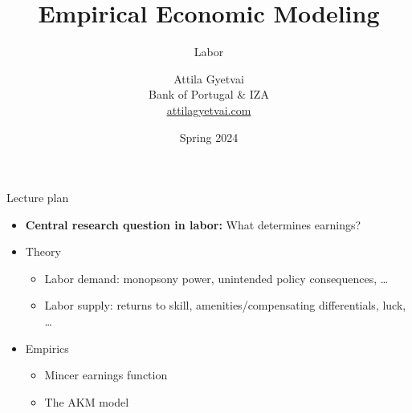 \documentclass[aspectratio=169,compress,t,xcolor=table]{beamer}
\title[]{Empirical Economic Modeling}
\subtitle{Labor}
\author[]{%
  \texorpdfstring{%
    Attila Gyetvai \\ \vspace*{0.5em} \footnotesize Bank of Portugal \& IZA \\ \href{https://attilagyetvai.com}{\color{MyStructure}\ul{attilagyetvai.com}}
  }{Gyetvai}
}
\date[]{\footnotesize Spring 2024}
\begin{document}
{
\begin{frame}
  \titlepage
\end{frame}
}
\addtocounter{framenumber}{-1}

\begin{frame}{Lecture plan}
  \begin{itemize}
    \vfill\item {\color{MyStructure}\textbf{Central research question in labor:}} What determines earnings?
    \vfill\item Theory
    \begin{itemize}
      \addtolength{\baselineskip}{1em}
      \item Labor demand: monopsony power, unintended policy consequences, \ldots
      \item Labor supply: returns to skill, amenities/compensating differentials, luck, \ldots
    \end{itemize}
    \vfill\item Empirics
    \begin{itemize}
      \addtolength{\baselineskip}{1em}
      \item Mincer earnings function
      \item The AKM model
    \end{itemize}
  \end{itemize}
\end{frame}
\end{document}
